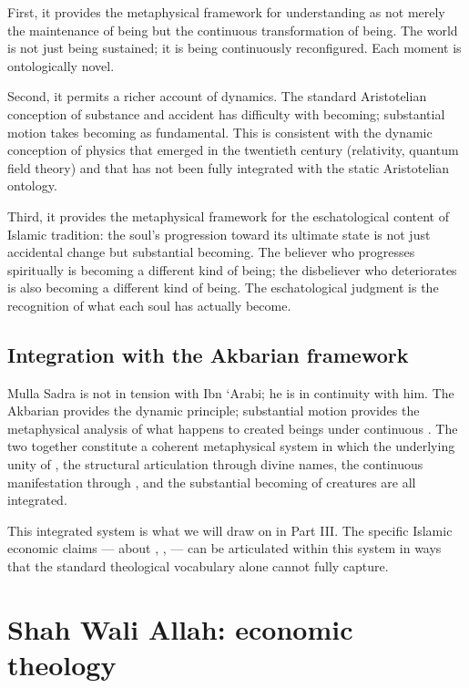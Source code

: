 First, it provides the metaphysical framework for understanding
 as not merely the maintenance of being but the
continuous transformation of being. The world is not just being
sustained; it is being continuously reconfigured. Each moment is
ontologically novel.

Second, it permits a richer account of dynamics. The standard
Aristotelian conception of substance and accident has difficulty
with becoming; substantial motion takes becoming as fundamental.
This is consistent with the dynamic conception of physics that
emerged in the twentieth century (relativity, quantum field theory)
and that has not been fully integrated with the static Aristotelian
ontology.

Third, it provides the metaphysical framework for the eschatological
content of Islamic tradition: the soul's progression toward its
ultimate state is not just accidental change but substantial
becoming. The believer who progresses spiritually is becoming a
different kind of being; the disbeliever who deteriorates is also
becoming a different kind of being. The eschatological judgment is
the recognition of what each soul has actually become.

\subsection{Integration with the Akbarian framework}

Mulla Sadra is not in tension with Ibn `Arabi; he is in continuity
with him. The Akbarian  provides the dynamic principle;
substantial motion provides the metaphysical analysis of what
happens to created beings under continuous . The two
together constitute a coherent metaphysical system in which the
underlying unity of , the structural articulation through
divine names, the continuous manifestation through ,
and the substantial becoming of creatures are all integrated.

This integrated system is what we will draw on in Part III. The
specific Islamic economic claims --- about , ,
 --- can be articulated within this system in ways
that the standard theological vocabulary alone cannot fully capture.

\section{Shah Wali Allah: economic theology}
\label{sec:shah-wali-allah}

